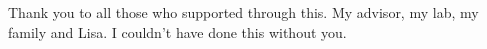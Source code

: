 Thank you to all those who supported through this. My advisor, my lab, my
family and Lisa. I couldn't have done this without you.
